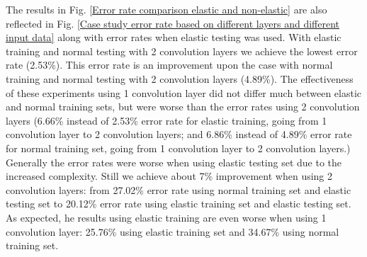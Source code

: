 The results in Fig. \ref{Error rate comparison elastic and non-elastic} are also reflected in Fig. \ref{Case study error rate based on different layers and different input data} along with error rates when elastic testing was used. With elastic training and normal testing with 2 convolution layers we achieve the lowest error rate (2.53\%). This error rate is an improvement upon the case with normal training and normal testing with 2 convolution layers (4.89\%). The effectiveness of these experiments using 1 convolution layer did not differ much between elastic and normal training sets, but were worse than the error rates using 2 convolution layers (6.66\% instead of 2.53\% error rate for elastic training, going from 1 convolution layer to 2 convolution layers; and 6.86\% instead of 4.89\% error rate for normal training set, going from 1 convolution layer to 2 convolution layers.) Generally the error rates were worse when using elastic testing set due to the increased complexity. Still we achieve about 7\% improvement when using 2 convolution layers: from 27.02\% error rate using normal training set and elastic testing set to 20.12\% error rate using elastic training set and elastic testing set. As expected, he results using elastic training are even worse when using 1 convolution layer: 25.76\% using elastic training set and 34.67\% using normal training set. 




